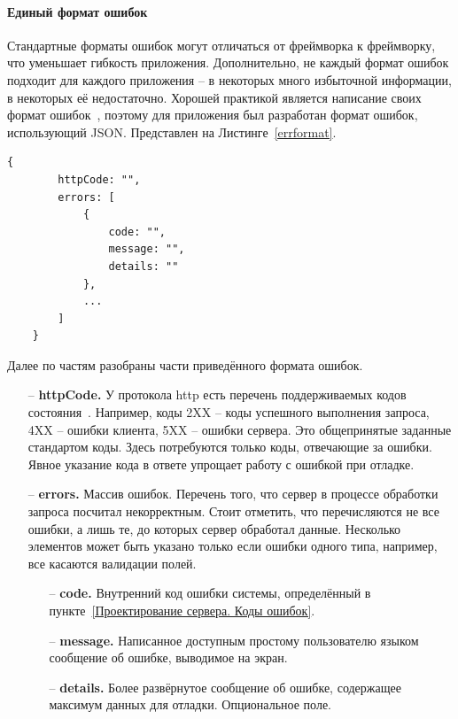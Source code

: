 \documentclass[a4paper,article]{article}
\begin{document}
\begin{sloppypar}
    \paragraph{Единый формат ошибок}\label{Единый формат ошибок}

    Стандартные форматы ошибок могут отличаться от фреймворка к фреймворку, что уменьшает гибкость приложения. Дополнительно, не каждый формат ошибок подходит для каждого приложения -- в некоторых много избыточной информации, в некоторых её недостаточно. Хорошей практикой является написание своих формат ошибок~\cite{httpadderrors}, поэтому для приложения был разработан формат ошибок, использующий JSON. Представлен на Листинге~\ref{errformat}.
    
    \newpage
    
    \begin{lstlisting}[label=errformat,caption=Формат ошибок]
    {
        httpCode: "",
        errors: [
            {
                code: "",
                message: "",
                details: ""
            },
            ...
        ]
    }
    \end{lstlisting}

    Далее по частям разобраны части приведённого формата ошибок.

    \begin{itemize}[nolistsep]
        \item[--] \textbf{httpCode.} У протокола http есть перечень поддерживаемых кодов состояния~\cite{httpstatus}. Например, коды 2XX -- коды успешного выполнения запроса, 4XX -- ошибки клиента, 5XX -- ошибки сервера. Это общепринятые заданные стандартом коды. Здесь потребуются только коды, отвечающие за ошибки. Явное указание кода в ответе упрощает работу с ошибкой при отладке.
        \item[--] \textbf{errors.} Массив ошибок. Перечень того, что сервер в процессе обработки запроса посчитал некорректным. Стоит отметить, что перечисляются не все ошибки, а лишь те, до которых сервер обработал данные. Несколько элементов может быть указано только если ошибки одного типа, например, все касаются валидации полей.
        \begin{itemize}[nolistsep]
            \item[--] \textbf{code.} Внутренний код ошибки системы, определённый в пункте~\ref{Проектирование сервера. Коды ошибок}.
            \item[--] \textbf{message.} Написанное доступным простому пользователю языком сообщение об ошибке, выводимое на экран.
            \item[--] \textbf{details.} Более развёрнутое сообщение об ошибке, содержащее максимум данных для отладки. Опциональное поле.
        \end{itemize}
    \end{itemize}


\end{sloppypar}
\end{document}
